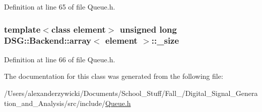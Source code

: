 Definition at line 65 of file Queue.\+h.

\hypertarget{classDSG_1_1Backend_1_1array_a44349f32c09ebb31d5eadbe9a222cba2}{
\subsubsection[{\+\_\+size}]{\setlength{\rightskip}{0pt plus 5cm}template$<$class element$>$ unsigned long {\bf D\+S\+G\+::\+Backend\+::array}$<$ element $>$\+::\+\_\+size\hspace{0.3cm}{\ttfamily [protected]}}}\label{classDSG_1_1Backend_1_1array_a44349f32c09ebb31d5eadbe9a222cba2}


Definition at line 66 of file Queue.\+h.



The documentation for this class was generated from the following file\+:\begin{DoxyCompactItemize}
\item 
/\+Users/alexanderzywicki/\+Documents/\+School\+\_\+\+Stuff/\+Fall\+\_/\+Digital\+\_\+\+Signal\+\_\+\+Generation\+\_\+and\+\_\+\+Analysis/src/include/\hyperlink{Queue_8h}{Queue.\+h}\end{DoxyCompactItemize}
